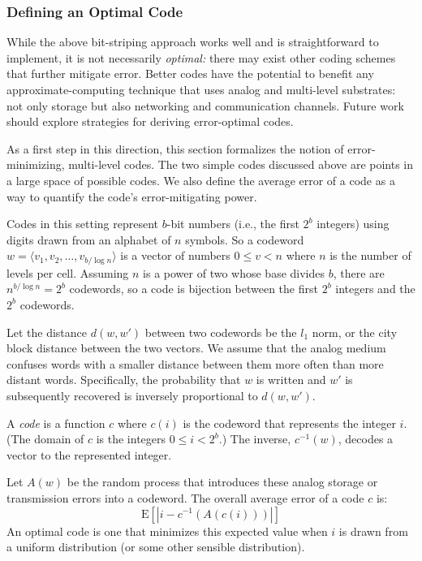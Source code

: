 \documentclass[prodmode,acmtocs]{acmsmall}
\begin{document}
\subsubsection{Defining an Optimal Code}

While the above bit-striping approach works well and is straightforward to
implement, it is not necessarily \emph{optimal:} there may exist other
coding schemes that further mitigate error.
Better codes have the potential to benefit any approximate-computing
technique that uses analog and multi-level substrates: not only storage but
also networking and communication channels.
Future work should explore strategies for deriving error-optimal codes.

As a first step in this direction, this section formalizes the notion of
error-minimizing, multi-level codes.
The two simple codes discussed above are points in a large space of possible
codes.
We also define the average error of a code as a way to quantify the code's error-mitigating
power.


Codes in this setting represent $b$-bit numbers (i.e., the first $2^b$ integers) using digits drawn from an alphabet of $n$ symbols. So a codeword $w = \langle v_1,
v_2, \dots, v_{b/\log n} \rangle$ is a vector of numbers $0 \le v < n$
where $n$ is the number of levels per cell. Assuming $n$ is a power of
two whose base divides $b$, there are $n ^ {b / \log n} = 2 ^ b$
codewords, so a code is bijection between the first $2^b$ integers and
the $2^b$ codewords.

Let the distance $d(w, w')$ between two codewords be the $l_1$ norm,
or the city block distance between the two vectors. We assume that the analog
medium confuses words with a smaller distance between them more often than
more distant words. Specifically, the probability that $w$ is written and $w'$ is subsequently recovered is inversely proportional to $d(w, w')$.

A \emph{code} is a function $c$ where $c(i)$ is the codeword that
represents the integer $i$. (The domain of $c$ is the integers $0 \le i <
2^b$.) The inverse, $c^{-1}(w)$, decodes a vector to the represented integer.

Let $A(w)$ be the random process that introduces these analog storage or
transmission errors into a codeword.
The overall average error of a code $c$ is:
%
$$\mathrm{E}\!\left[ |i - c^{-1}(A(c(i)))| \right]$$
%
An optimal code is one that minimizes this expected value when $i$
is drawn from a
uniform distribution (or some other sensible distribution).
\end{document}
